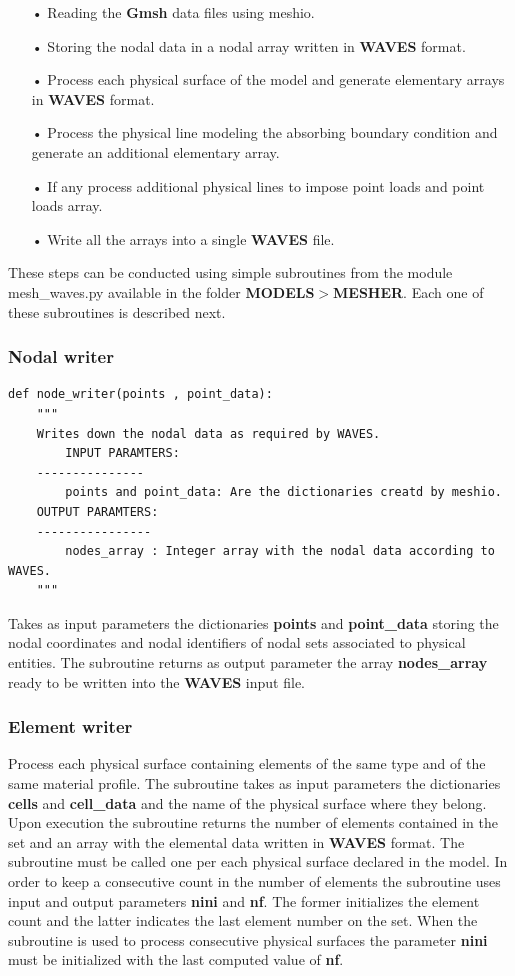 \documentclass[12pt,letterpaper]{article}
\begin{document}
\begin{enumerate}
\item[•] Reading the {\bf Gmsh} data files using meshio.
\item[•] Storing the nodal data in a nodal array written in {\bf WAVES} format.
\item[•] Process each physical surface of the model and generate elementary arrays in {\bf WAVES} format.
\item[•] Process the physical line modeling the absorbing boundary condition and generate an additional elementary array.
\item[•] If any process additional physical lines to impose point loads and point loads array.
\item[•] Write all the arrays into a single {\bf WAVES} file. 
\end{enumerate}

These steps can be conducted using simple subroutines from the module mesh\_waves.py available in the folder {\bf MODELS$>$MESHER}. Each one of these subroutines is described next.

\subsubsection*{Nodal writer}
\begin{verbatim}
def node_writer(points , point_data):
    """
    Writes down the nodal data as required by WAVES.
        INPUT PARAMTERS:
    ---------------
        points and point_data: Are the dictionaries creatd by meshio.
    OUTPUT PARAMTERS:
    ----------------
        nodes_array : Integer array with the nodal data according to WAVES.
    """
\end{verbatim}
Takes as input parameters the dictionaries {\bf points} and {\bf point\_data} storing the nodal coordinates and nodal identifiers of nodal sets associated to physical entities. The subroutine returns as output parameter the array {\bf nodes\_array} ready to be written into the {\bf WAVES} input file.

\subsubsection*{Element writer}
Process each physical surface containing elements of the same type and of the same material profile. The subroutine takes as input parameters the dictionaries {\bf cells} and {\bf cell\_data} and the name of the physical surface where they belong. Upon execution the subroutine returns the number of elements contained in the set and an array with the elemental data written in {\bf WAVES} format.  The subroutine must be called one per each physical surface declared in the model. In order to keep a consecutive count in the number of elements the subroutine uses input and output parameters {\bf nini} and {\bf nf}. The former initializes the element count and the latter indicates the last element number on the set. When the subroutine is used to process consecutive physical surfaces the parameter {\bf nini} must be initialized with the last computed value of {\bf nf}. 
\end{document}
